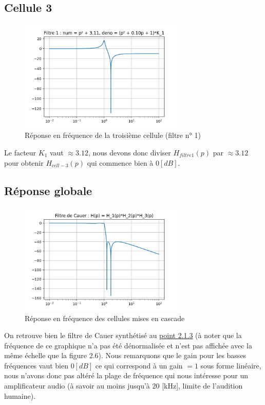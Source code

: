\documentclass[a4paper,12pt,oneside]{report}	%
\begin{document}
\newpage
        \subsection{Cellule 3}
            \begin{figure}[h!]
                \centering
                \includegraphics[width = 8cm]{images/2.0.4 - Filtre 1.png}
                \caption{Réponse en fréquence de la troisième cellule (filtre n° 1)}
                \label{fig:repfreq-filtre-1}
            \end{figure}
            Le facteur $K_1$ vaut $\approx 3.12$, nous devons donc diviser $H_{filtre 1}(p)$ par $\approx 3.12$ pour obtenir $H_{cell-3}(p)$ qui commence bien à $0 [dB]$.
        \subsection{Réponse globale}
            \begin{figure}[h!]
                \centering
                \includegraphics[width = 8cm]{images/2.0.4 - Cauer.png}
                \caption{Réponse en fréquence des cellules mises en cascade}
                \label{fig:repfreq-filtre-1}
            \end{figure}
            On retrouve bien le filtre de Cauer synthétisé au \hyperref[fig:repfreq-Cauer]{point 2.1.3} (à noter que la fréquence de ce graphique n'a pas été dénormalisée et n'est pas affichée avec la même échelle que la figure 2.6). Nous remarquons que le gain pour les basses fréquences vaut bien $0[dB]$ ce qui correspond à un gain $= 1$ sous forme linéaire, nous n'avons donc pas altéré la plage de fréquence qui nous intéresse pour un amplificateur audio (à savoir au moins jusqu'à 20 [kHz], limite de l'audition humaine).
\newpage
\end{document}

